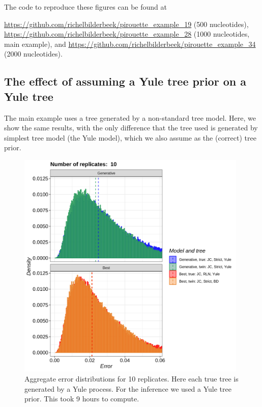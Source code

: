 The code to reproduce these figures can be found at  
\begin{sloppypar}
  \url{https://github.com/richelbilderbeek/pirouette_example_19} (500 nucleotides),
  \url{https://github.com/richelbilderbeek/pirouette_example_28} (1000 nucleotides, main example),
  and \url{https://github.com/richelbilderbeek/pirouette_example_34} (2000 nucleotides).
\end{sloppypar}

\newpage

\subsection{The effect of assuming a Yule tree prior on a Yule tree}
\label{subsec:simplest_correct_parameterization}

The main example uses a tree generated by a non-standard tree model.
Here, we show the same results, with the only difference that
the tree used is generated by simplest tree model (the Yule model),
which we also assume as the (correct) tree prior.

\begin{figure}[H]
  \includegraphics[width=0.98\textwidth]{pirouette_example_22/errors.png}
  \caption{Aggregate error distributions for 10 replicates. Here each true tree is generated by a Yule process. For the inference we used a Yule tree prior. This took 9 hours to compute.}
  \label{fig:example_yule}
\end{figure}

